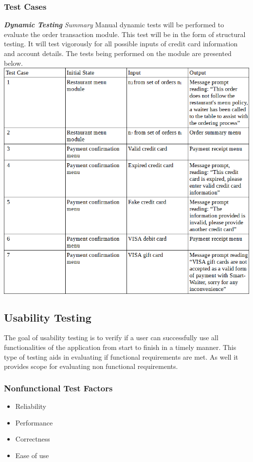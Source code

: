 \documentclass[12pt]{article}
\begin{document}
\subsubsection{Test Cases}
\textbf{\textit{Dynamic Testing}}\newline
\newline
\textit{Summary}\newline
Manual dynamic tests will be performed to evaluate the order transaction module. This test will be in the form of structural testing. It will test vigorously for all possible inputs of credit card information and account details. The tests being performed on the module are presented below. 
\newline
\includegraphics[width=\textwidth,height=\textheight,keepaspectratio]{orderTransactionTC.png}

\subsection{Usability Testing}
The goal of usability testing is to verify if a user can successfully use all functionalities of the application from start to finish in a timely manner. This type of testing aids in evaluating if functional requirements are met. As well it provides scope for evaluating non functional requirements.
\subsubsection{Nonfunctional Test Factors}
\begin{itemize}
  \item Reliability 
  \item Performance
  \item 	Correctness
  \item 	Ease of use
\end{itemize}
\end{document}
